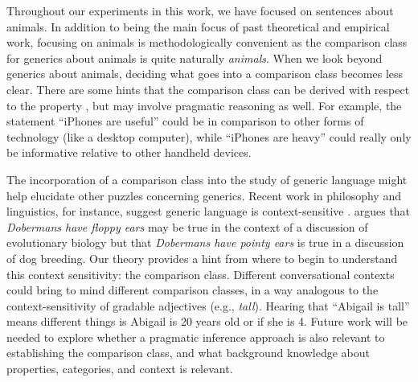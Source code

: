\documentclass[12pt,letterpaper]{article}
\begin{document}
Throughout our experiments in this work, we have focused on sentences about animals. 
In addition to being the main focus of past theoretical and empirical work, focusing on animals is methodologically convenient as the comparison class for generics about animals is quite naturally \emph{animals}.
When we look beyond generics about animals, deciding what goes into a comparison class becomes less clear.
There are some hints that the comparison class can be derived with respect to the property \cite{Keil1979}, but may involve pragmatic reasoning as well. 
For example, the statement ``iPhones are useful'' could be in comparison to other forms of technology (like a desktop computer), while ``iPhones are heavy'' could really only be informative relative to other handheld devices.

The incorporation of a comparison class into the study of generic language might help elucidate other puzzles concerning generics.
Recent work in philosophy and linguistics, for instance, suggest generic language is context-sensitive \cite{Nickel2008, Sterken2015}.
 argues that \emph{Dobermans have floppy ears} may be true in the context of a discussion of evolutionary biology but that \emph{Dobermans have pointy ears} is true in a discussion of dog breeding.
Our theory provides a hint from where to begin to understand this context sensitivity: the comparison class.
Different conversational contexts could bring to mind different comparison classes, in a way analogous to the context-sensitivity of  gradable adjectives (e.g., \emph{tall}). 
Hearing that ``Abigail is tall'' means different things is Abigail is 20 years old or if she is 4. 
Future work will be needed to explore whether a pragmatic inference approach is also relevant to establishing the comparison class, and what background knowledge about properties, categories, and context is relevant.

\end{document}
